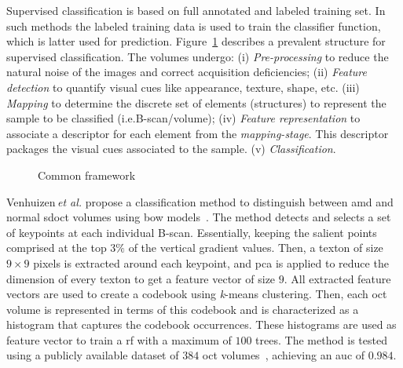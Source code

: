 Supervised classification is based on full annotated and labeled training set.
In such methods the labeled training data is used to train the classifier function, which is latter used for prediction.
%
Figure~\ref{fig:ML-scheme} describes a prevalent structure for supervised classification.
The volumes undergo:
(i) \emph{Pre-processing} to reduce the natural noise of the images and correct acquisition deficiencies;
(ii) \emph{Feature detection} to quantify visual cues like appearance, texture, shape, etc.
(iii) \emph{Mapping} to determine the discrete set of elements (structures) to represent the sample to be classified (i.e.B-scan/volume);
(iv) \emph{Feature representation} to associate a descriptor for each element from the \emph{mapping-stage}.
This descriptor packages the visual cues associated to the sample.
(v) \emph{Classification}.


\begin{figure}
  \caption{Common framework}
  \label{fig:ML-scheme}
\end{figure}

%
Venhuizen\,\textit{et al.} propose a classification method to distinguish between \gls{amd} and normal \gls{sdoct} volumes using \gls{bow} models~\cite{Venhuizen2015}.
%
The method detects and selects a set of keypoints at each individual B-scan.
Essentially, keeping the salient points comprised at the top $3\%$ of the vertical gradient values.
Then, a texton of size $9 \times 9$ pixels is extracted around each keypoint, and \gls{pca} is applied to reduce the dimension of every texton to get a feature vector of size $9$.
All extracted feature vectors are used to create a codebook using \textit{k}-means clustering.
Then, each \gls{oct} volume is represented in terms of this codebook and is characterized as a histogram that captures the codebook occurrences.
These histograms are used as feature vector to train a \gls{rf} with a maximum of $100$ trees.
%
The method is tested using a publicly available dataset of $384$ \gls{oct} volumes~\cite{farsiu2014quantitative}, achieving an \gls{auc} of $0.984$.


